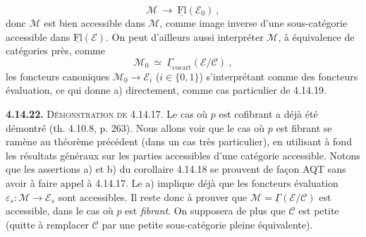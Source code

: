 \documentclass[11pt]{article}
\newcommand{\printedpage}[1]{\marginpar{\footnotesize p.~#1}}
\newcommand{\msp}[1]{\marginpar{\footnotesize [#1]}}
\newcommand{\uGamma}{\underline{\Gamma}}
\newcommand{\uFl}{\underline{\mathrm{Fl}}}
\newcommand{\cocart}{\mathrm{cocart}}
\begin{document}
\[
\mathcal{M} \ \longrightarrow \ \uFl(\mathcal{E}_0) \ ,
\]
donc $\mathcal{M}$ est bien accessible dans $\mathcal{M}$, comme image inverse d’une sous-catégorie accessible dans $\uFl(\mathcal{E})$. On peut d’ailleurs aussi interpréter $\mathcal{M}$, à équivalence de catégories près, comme %
\msp{page 400}
\[
\mathcal{M}_0 \ \simeq \ \uGamma_{\cocart}(\mathcal{E}/\mathcal{C}) \ ,
\]
les foncteurs canoniques $\mathcal{M}_0 \longrightarrow \mathcal{E}_i$ ($i \in \{0,1\}$) s’interprétant comme des foncteurs évaluation, ce qui donne a) directement, comme cas particulier de 4.14.19. %

\printedpage{152}

\textbf{4.14.22.} \textsc{Démonstration de} 4.14.17. Le cas où $p$ est cofibrant a déjà été démontré (th. 4.10.8, p. 263). Nous allons voir que le cas où $p$ est fibrant se ramène au théorème précédent (dans un cas très particulier), en utilisant à fond les résultats généraux sur les parties accessibles d’une catégorie accessible. Notons que les assertions a) et b) du corollaire 4.14.18 se prouvent de façon AQT sans avoir à faire appel à 4.14.17. Le a) implique déjà que les foncteurs évaluation $\varepsilon_s : \mathcal{M} \longrightarrow \mathcal{E}_s$ sont accessibles. Il reste donc à prouver
\msp{page 401}
que $\mathcal{M} = \uGamma(\mathcal{E}/\mathcal{C})$ est accessible, dans le cas où $p$ est \textit{fibrant}. On supposera de plus que $\mathcal{C}$ est petite (quitte à remplacer $\mathcal{C}$ par une petite sous-catégorie pleine équivalente).
\end{document}
